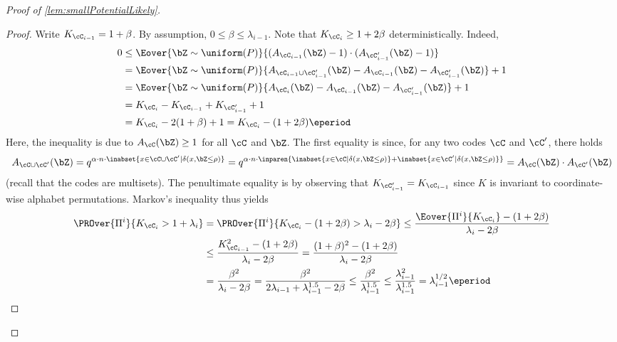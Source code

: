 \documentclass[11pt]{article}
\begin{document}
\begin{proof}[Proof of \cref{lem:smallPotentialLikely}]
\begin{proof}
    Write $K_{\cC_{i-1}} = 1 + \beta$. By assumption, $0\le \beta \le \lambda_{i-1}$. Note that $K_{\cC_{i}} \ge 1 + 2\beta$ deterministically. Indeed,
    \begin{align*}
    0 &\le \Eover{\bZ\sim \uniform(P)}{(A_{\cC_{i-1}}(\bZ)-1)\cdot (A_{\cC'_{i-1}}(\bZ)-1)} \\&= \Eover{\bZ\sim \uniform(P)}{A_{\cC_{i-1}\cup \cC'_{i-1}}(\bZ) - A_{\cC_{i-1}}(\bZ) - A_{\cC'_{i-1}}(\bZ)} + 1  \\&= \Eover{\bZ\sim \uniform(P)}{A_{\cC_i}(\bZ) - A_{\cC_{i-1}}(\bZ) - A_{\cC'_{i-1}}(\bZ)} + 1 \\
    &= K_{\cC_i} - K_{\cC_{i-1}} + K_{\cC'_{i-1}} + 1 \\
    &= K_{\cC_i} - 2(1+\beta) + 1 = K_{\cC_i} - (1+2\beta)\eperiod
    \end{align*}
    Here, the  inequality is due to $A_{\cC}(\bZ) \ge 1$ for all $\cC$ and $\bZ$. The first equality is since, for any two codes $\cC$ and $\cC'$, there holds
    $$A_{\cC\cup \cC'}(\bZ) = q^{\alpha\cdot n\cdot\inabset{x\in \cC\cup\cC'\mid\delta(x,\bZ\le \rho)}} = q^{\alpha\cdot n\cdot\inparen{\inabset{x\in \cC\mid\delta(x,\bZ\le \rho)}+\inabset{x\in \cC'\mid\delta(x,\bZ\le \rho)}}} = A_{\cC}(\bZ) \cdot A_{\cC'}(\bZ)$$
    (recall that the codes are multisets).    
    The penultimate equality is by observing that $K_{\cC'_{i-1}} = K_{\cC_{i-1}}$ since $K$ is invariant to coordinate-wise alphabet permutations.
    Markov's inequality thus yields
    \begin{align*}
    \PROver{\Pi^i}{K_{\cC_i} > 1+\lambda_i} &= \PROver{\Pi^i}{K_{\cC_i} - (1+2\beta) > \lambda_i-2\beta} \le \frac{\Eover{\Pi^i}{K_{\cC_i}}-(1+2\beta)}{\lambda_i-2\beta} \\&\le \frac{K_{\cC_{i-1}}^2-(1+2\beta)}{\lambda_i-2\beta} = \frac{(1+\beta)^2-(1+2\beta)}{\lambda_i-2\beta} \\
    &= \frac{\beta^2}{\lambda_i - 2\beta}  = \frac{\beta^2}{2\lambda_{i-1}+\lambda_{i-1}^{1.5}-2\beta} \le \frac{\beta^2}{\lambda_{i-1}^{1.5}} \le \frac{\lambda_{i-1}^2}{\lambda_{i-1}^{1.5}} = \lambda_{i-1}^{1/2}\eperiod
    \end{align*}   
    \end{proof}


\end{proof}
\end{document}
